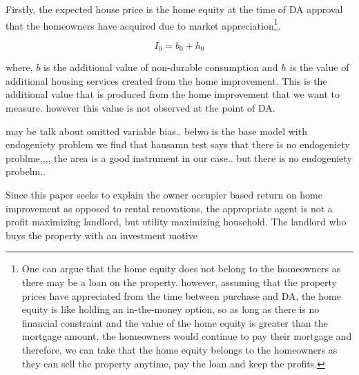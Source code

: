 Firstly, the expected house price is the home equity at the time of DA approval that the homeowners have acquired due to market appreciation\footnote{One can argue that the home equity does not belong to the homeowners as there may be a loan on the property. however, assuming that the property prices have appreciated from the time between purchase and DA, the home equity is like holding an in-the-money option, so as long as there is no financial constraint and the value of the home equity is greater than the mortgage amount, the homeowners would continue to pay their mortgage and therefore, we can take that the home equity belongs to the homeowners as they can sell the property anytime, pay the loan and keep the profits.}. 




$$I_0 = b_0 + h_0$$

where, $b$ is the additional value of non-durable consumption and $h$ is the value of additional housing services created from the home improvement. This is the additional value that is produced from the home improvement that we want to measure. however this value is not observed at the point of DA.  



may be talk about omitted variable bias..
 belwo is the base model with endogeniety problem we find that hausamn test says that there is no endogeniety problme,,,, the area is a good instrument in our case.. but there is no endogeniety probelm..
 
 
 
 Since this paper seeks to explain the owner occupier based return on home improvement as opposed to rental renovations, the appropriate agent is not a profit maximizing landlord, but utility maximizing household. The landlord who buys the property with an investment motive
 
 
 
